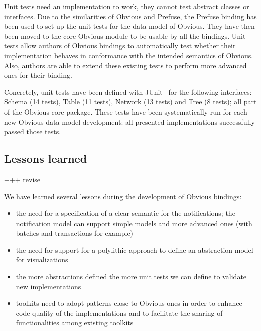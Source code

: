 Unit tests need an implementation to work, they cannot test abstract
classes or interfaces.  Due to the similarities of Obvious and
Prefuse, the Prefuse binding has been used to set up the unit tests
for the data model of Obvious.  They have then been moved to the core
Obvious module to be usable by all the bindings.  Unit tests allow
authors of Obvious bindings to automatically test whether their
implementation behaves in conformance with the intended semantics of
Obvious.  Also, authors are able to extend these existing tests to
perform more advanced ones for their binding.

Concretely, unit tests have been defined with JUnit~\cite{JUnit} for
the following interfaces: Schema (14 tests), Table (11 tests), Network
(13 tests) and Tree (8 tests); all part of the Obvious core package.
These tests have been systematically run for each new Obvious data
model development: all presented implementations successfully passed
those tests.


\subsection{Lessons learned}

+++ revise

We have learned several lessons during the development of Obvious
bindings:

\begin{itemize}
\item the need for a specification of a clear semantic for the
  notifications; the notification model can support simple models and
  more advanced ones (with batches and transactions for example)
\item the need for support for a polylithic approach to define an
  abstraction model for visualizations
\item the more abstractions defined the more unit tests we can define
  to validate new implementations
\item toolkits need to adopt patterns close to Obvious ones in order
  to enhance code quality of the implementations and to facilitate the
  sharing of functionalities among existing toolkits
\end{itemize}



